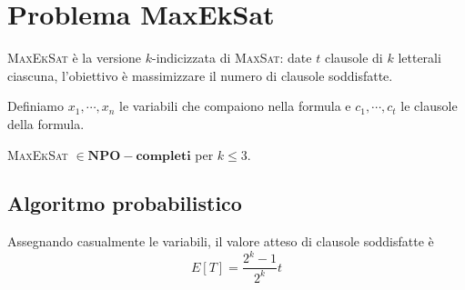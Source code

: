 \section{Problema MaxEkSat}
\textsc{MaxEkSat} è la versione $k$-indicizzata di \textsc{MaxSat}: date $t$ clausole
di $k$ letterali ciascuna, l'obiettivo è massimizzare il numero di clausole
soddisfatte.

Definiamo $x_1, \cdots, x_n$ le variabili che compaiono nella formula
e $c_1, \cdots, c_t$ le clausole della formula.

\begin{theorem}\label{thm:maxeksatnp}
	\textsc{MaxEkSat} $\in \mathbf{NPO-completi}$ per $k \leq 3$.
\end{theorem}

\subsection{Algoritmo probabilistico}
\begin{theorem}\label{thm:probassgn}
	Assegnando casualmente le variabili, il valore atteso di clausole soddisfatte è
	$$
		E[T] = \frac{2^k-1}{2^k} t
	$$
\end{theorem}
